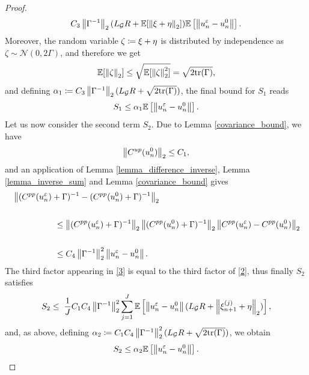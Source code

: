 \documentclass[10pt]{article}
\begin{document}
\begin{proof}
\begin{equation*}
C_3 \left\|\Gamma^{-1}\right\|_2 (L_{\mathcal{G}} R + \mathbb{E} [\left\|\xi + \eta\right\|_2]) \mathbb{E} \left [ \left\|u_n^{\varepsilon} - u_n^0\right\| \right ].
\end{equation*}
Moreover, the random variable $\zeta \coloneqq \xi + \eta$ is distributed by independence as $\zeta \sim \mathcal{N}(0,2\Gamma)$, and therefore we get
\begin{equation*}
\mathbb{E}[\left\|\zeta\right\|_2] \le \sqrt{\mathbb{E}[\left\|\zeta\right\|_2^2]} = \sqrt{2\mathrm{tr}(\Gamma)},
\end{equation*}
and defining $\alpha_1 \coloneqq C_3 \left\|\Gamma^{-1}\right\|_2 (L_{\mathcal{G}} R + \sqrt{2\mathrm{tr}(\Gamma)})$, the final bound for $S_1$ reads
\begin{equation}
\label{bound2}
S_1 \leq \alpha_1 \mathbb{E} \left [ \left\|u_n^{\varepsilon} - u_n^0\right\| \right ].
\end{equation}
Let us now consider the second term $S_2$. Due to Lemma \ref{covariance_bound}, we have
\begin{equation}\label{boundCup}
\left\|C^{up}(u_n^0)\right\|_2 \le C_1,
\end{equation}
and an application of Lemma \ref{lemma_difference_inverse}, Lemma \ref{lemma_inverse_sum} and Lemma \ref{covariance_bound} gives
\begin{align*}
& \left\|(C^{pp}(u_n^{\varepsilon}) + \Gamma)^{-1} - (C^{pp}(u_n^0) + \Gamma)^{-1}\right\|_2 \\ \\
& \hspace{50pt} \le \left\|(C^{pp}(u_n^{\varepsilon}) + \Gamma)^{-1}\right\|_2 \left\|(C^{pp}(u_n^0) + \Gamma)^{-1}\right\|_2 \left\|C^{pp}(u_n^{\varepsilon}) - C^{pp}(u_n^0)\right\|_2 \\ \\
& \hspace{50pt} \le C_4 \left\|\Gamma^{-1}\right\|_2^2  \left\|u_n^{\varepsilon} - u_n^0\right\|.
\end{align*}
The third factor appearing in \eqref{3} is equal to the third factor of \eqref{2}, thus finally $S_2$ satisfies
\begin{equation*}
S_2 \leq \; \frac{1}{J} C_1 C_4 \left\|\Gamma^{-1}\right\|_2^2 \sum_{j=1}^J \mathbb{E} \left [ \left\|u_n^{\varepsilon} - u_n^0\right\| (L_{\mathcal{G}} R + \left\|\xi_{n+1}^{(j)} + \eta\right\|_2) \right ],
\end{equation*}
and, as above, defining $\alpha_2 \coloneqq C_1 C_4 \left\|\Gamma^{-1}\right\|_2^2 (L_{\mathcal{G}} R + \sqrt{2\mathrm{tr}(\Gamma)})$, we obtain
\begin{equation}
\label{bound3}
S_2 \leq \alpha_2 \mathbb{E} \left [ \norm{u_n^{\varepsilon} - u_n^0} \right ].

\end{equation}
\end{proof}
\end{document}
